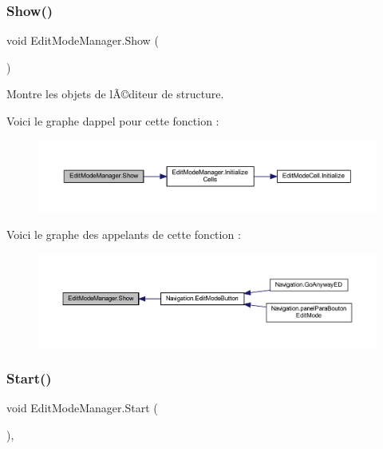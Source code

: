 \subsubsection{\texorpdfstring{Show()}{Show()}}
{\footnotesize\ttfamily void Edit\+Mode\+Manager.\+Show (\begin{DoxyParamCaption}{ }\end{DoxyParamCaption})\hspace{0.3cm}{\ttfamily [inline]}}



Montre les objets de l\textquotesingle{}Ã©diteur de structure. 

Voici le graphe d\textquotesingle{}appel pour cette fonction \+:
\nopagebreak
\begin{figure}[H]
\begin{center}
\leavevmode
\includegraphics[width=350pt]{class_edit_mode_manager_acf80baac30f6611bcb1bf97b61ffc1ca_cgraph}
\end{center}
\end{figure}
Voici le graphe des appelants de cette fonction \+:
\nopagebreak
\begin{figure}[H]
\begin{center}
\leavevmode
\includegraphics[width=350pt]{class_edit_mode_manager_acf80baac30f6611bcb1bf97b61ffc1ca_icgraph}
\end{center}
\end{figure}
\mbox{\label{class_edit_mode_manager_a4f5385630cfd8a65e1aac37f79b4f8d3}} 
\subsubsection{\texorpdfstring{Start()}{Start()}}
{\footnotesize\ttfamily void Edit\+Mode\+Manager.\+Start (\begin{DoxyParamCaption}{ }\end{DoxyParamCaption})\hspace{0.3cm}{\ttfamily [inline]}, {\ttfamily [private]}}







